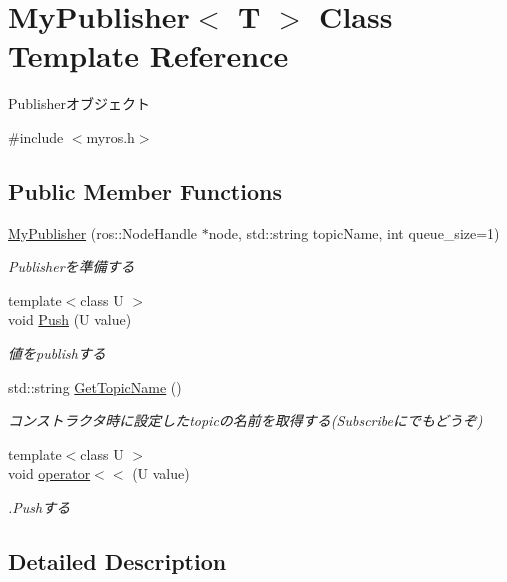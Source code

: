 \section{My\-Publisher$<$ T $>$ Class Template Reference}
\label{classMyPublisher}


Publisherオブジェクト  




{\ttfamily \#include $<$myros.\-h$>$}

\subsection*{Public Member Functions}
\begin{DoxyCompactItemize}
\item 
\hyperlink{classMyPublisher_a3ce5354492470a4f3147d52826014815}{My\-Publisher} (ros\-::\-Node\-Handle $\ast$node, std\-::string topic\-Name, int queue\-\_\-size=1)
\begin{DoxyCompactList}\small\item\em Publisherを準備する \end{DoxyCompactList}\item 
{\footnotesize template$<$class U $>$ }\\void \hyperlink{classMyPublisher_a429cb336dc3423784854cf5b8bb10883}{Push} (U value)
\begin{DoxyCompactList}\small\item\em 値をpublishする \end{DoxyCompactList}\item 
std\-::string \hyperlink{classMyPublisher_ac3746c9df0fd15b945acd7880c5fbc94}{Get\-Topic\-Name} ()
\begin{DoxyCompactList}\small\item\em コンストラクタ時に設定したtopicの名前を取得する(Subscribeにでもどうぞ) \end{DoxyCompactList}\item 
{\footnotesize template$<$class U $>$ }\\void \hyperlink{classMyPublisher_a8b0d70721eb56b66cc00ce7bd192e76c}{operator$<$$<$} (U value)
\begin{DoxyCompactList}\small\item\em .Pushする \end{DoxyCompactList}\end{DoxyCompactItemize}


\subsection{Detailed Description}
